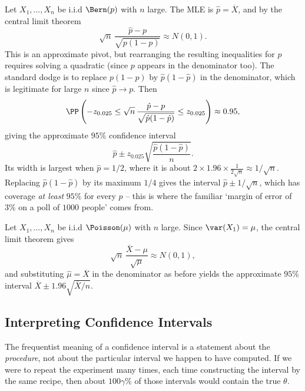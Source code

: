 \begin{example}
  Let $X_1, \dots, X_n$ be i.i.d $\Bern(p)$ with $n$ large. The MLE is $\hat p = \overline{X}$, and by the central limit theorem
  $$
  \sqrt{n}\,\frac{\hat p - p}{\sqrt{p(1-p)}} \approx N(0,1).
  $$
  This is an approximate pivot, but rearranging the resulting inequalities for $p$ requires solving a quadratic (since $p$ appears in the denominator too). The standard dodge is to replace $p(1-p)$ by $\hat p (1 - \hat p)$ in the denominator, which is legitimate for large $n$ since $\hat p \to p$. Then
  $$
  \PP\left(-z_{0.025} \leq \sqrt{n}\,\frac{\hat p - p}{\sqrt{\hat p(1-\hat p)}} \leq z_{0.025}\right) \approx 0.95,
  $$
  giving the approximate $95\%$ confidence interval
  $$
  \hat p \pm z_{0.025}\sqrt{\frac{\hat p (1-\hat p)}{n}}.
  $$
  Its width is largest when $\hat p = 1/2$, where it is about $2 \times 1.96 \times \frac{1}{2\sqrt{n}} \approx 1/\sqrt{n}$. Replacing $\hat p (1-\hat p)$ by its maximum $1/4$ gives the  interval $\hat p \pm 1/\sqrt{n}$, which has coverage \emph{at least} $95\%$ for every $p$ -- this is where the familiar `margin of error of $3\%$ on a poll of $1000$ people' comes from.
\end{example}

\begin{example}
  Let $X_1, \dots, X_n$ be i.i.d $\Poisson(\mu)$ with $n$ large. Since $\var(X_1) = \mu$, the central limit theorem gives
  $$
  \sqrt{n}\,\frac{\overline{X} - \mu}{\sqrt{\mu}} \approx N(0,1),
  $$
  and substituting $\hat\mu = \overline{X}$ in the denominator as before yields the approximate $95\%$ interval $\overline{X} \pm 1.96\sqrt{\overline{X}/n}$.
\end{example}

\subsection{Interpreting Confidence Intervals}

The frequentist meaning of a confidence interval is a statement about the \emph{procedure}, not about the particular interval we happen to have computed. If we were to repeat the experiment many times, each time constructing the interval by the same recipe, then about $100\gamma\%$ of those intervals would contain the true $\theta$.


